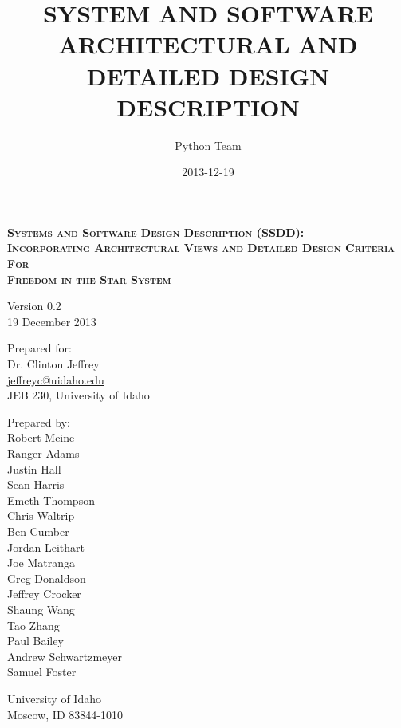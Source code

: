 \documentclass[twoside,letterpaper]{article}
\title{SYSTEM AND SOFTWARE ARCHITECTURAL AND DETAILED DESIGN DESCRIPTION}
\author{Python Team}
\date{2013-12-19}
\begin{document}
\setlength{\aboverulesep}{0pt}
\setlength{\belowrulesep}{0pt}
\setlength{\extrarowheight}{.75ex}

\begin{minipage}{\linewidth}
\centering
\textsc{
	\textbf{
		Systems and Software Design Description (SSDD):\\
		Incorporating Architectural Views and Detailed Design Criteria\\
							For								   	\\
							\vspace{1em}
						{\Large Freedom in the Star System}		\\
}}
\end{minipage}

\vspace{2em}


\begin{minipage}{\linewidth}
\centering
Version 0.2\\
19 December 2013\\

\vspace{2em}

Prepared for:\\
Dr. Clinton Jeffrey\\
\url{jeffreyc@uidaho.edu}\\
JEB 230, University of Idaho

\vspace{2em}

Prepared by:\\
Robert Meine\\
Ranger Adams\\
Justin Hall\\
Sean Harris\\
Emeth Thompson\\
Chris Waltrip\\
Ben Cumber\\
Jordan Leithart\\
Joe Matranga\\
Greg Donaldson\\
Jeffrey Crocker\\
Shaung Wang\\
Tao Zhang\\
Paul Bailey\\
Andrew Schwartzmeyer\\
Samuel Foster\\

\vspace{1em}

University of Idaho\\
Moscow, ID 83844-1010
\end{minipage}
\end{document}
